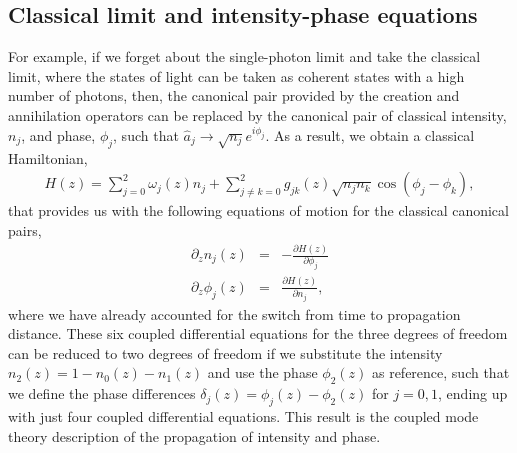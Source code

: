 \documentclass[9pt,twocolumn,twoside]{osajnl}
\begin{document}
\subsection{Classical limit and intensity-phase equations}
For example, if we forget about the single-photon limit and take the classical limit, where the states of light can be taken as coherent states with a high number of photons, then, the canonical pair provided by the creation and annihilation operators can be replaced by the canonical pair of classical intensity, $n_{j}$, and phase, $\phi_{j}$, such that $\hat{a}_{j} \rightarrow \sqrt{n_{j}} e^{i \phi_{j}}$. As a result, we obtain a classical Hamiltonian, 
\begin{eqnarray}\label{eq:clHamiltonian}
	H(z) = \sum_{j=0}^{2} \omega_{j}(z) n_{j}  
	+ \sum_{j \neq k = 0}^{2} g_{jk}(z) \sqrt{n_{j} n_{k}} \cos \left( \phi_{j} - \phi_{k} \right),
\end{eqnarray}
that provides us with the following equations of motion for the classical canonical pairs, 
\begin{eqnarray}
	\partial_z n_j(z) &=& -\frac{\partial H(z)}{\partial \phi_j}\\
	\partial_z \phi_j(z) &=& \frac{\partial H(z)}{\partial n_j},
\end{eqnarray}
where we have already accounted for the switch from time to propagation distance.
These six coupled differential equations for the three degrees of freedom can be reduced to two degrees of freedom if we substitute the intensity $n_{2}(z) = 1 - n_{0}(z)- n_{1}(z)$ and use the phase $\phi_{2}(z)$ as reference, such that we define the phase differences $\delta_{j}(z) = \phi_{j}(z) - \phi_{2}(z)$ for $j=0,1$, ending up with just four coupled differential equations.
This result is the coupled mode theory description of the propagation of intensity and phase.
\end{document}
